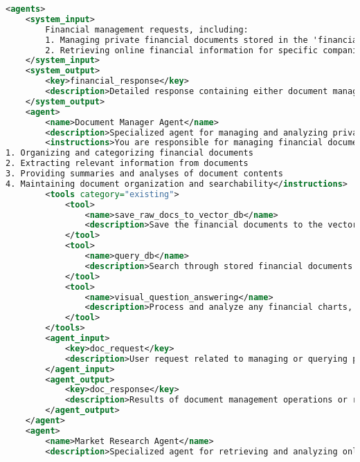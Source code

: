 \begin{lstlisting}[basicstyle=\ttfamily\footnotesize, frame=shadowbox, columns=fullflexible, breaklines=true, breakatwhitespace=true, breakindent=3pt, language=XML, xleftmargin=0.02\linewidth, xrightmargin=0.02\linewidth, caption={AI-generated Creation Profile of \textbf{Financial Agent}}, label={lst:multi_form}]
<agents>
    <system_input>
        Financial management requests, including:
        1. Managing private financial documents stored in the 'financial_docs' folder
        2. Retrieving online financial information for specific companies (balance sheets, cash flow statements, income statements)
    </system_input>
    <system_output>
        <key>financial_response</key>
        <description>Detailed response containing either document management results or requested financial information.</description>
    </system_output>
    <agent>
        <name>Document Manager Agent</name>
        <description>Specialized agent for managing and analyzing private financial documents stored locally.</description>
        <instructions>You are responsible for managing financial documents in the 'financial_docs' folder. Your tasks include:
1. Organizing and categorizing financial documents
2. Extracting relevant information from documents
3. Providing summaries and analyses of document contents
4. Maintaining document organization and searchability</instructions>
        <tools category="existing">
            <tool>
                <name>save_raw_docs_to_vector_db</name>
                <description>Save the financial documents to the vector database for efficient searching and retrieval.</description>
            </tool>
            <tool>
                <name>query_db</name>
                <description>Search through stored financial documents to find relevant information.</description>
            </tool>
            <tool>
                <name>visual_question_answering</name>
                <description>Process and analyze any financial charts, graphs, or visual data in the documents.</description>
            </tool>
        </tools>
        <agent_input>
            <key>doc_request</key>
            <description>User request related to managing or querying private financial documents.</description>
        </agent_input>
        <agent_output>
            <key>doc_response</key>
            <description>Results of document management operations or requested document information.</description>
        </agent_output>
    </agent>
    <agent>
        <name>Market Research Agent</name>
        <description>Specialized agent for retrieving and analyzing online financial information for publicly traded companies.</description>

\end{lstlisting}
